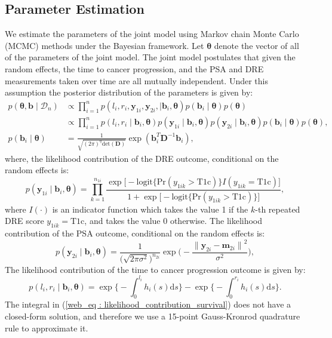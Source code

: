 \subsection{Parameter Estimation}
We estimate the parameters of the joint model using Markov chain Monte Carlo (MCMC) methods under the Bayesian framework. Let $\boldsymbol{\theta}$ denote the vector of all of the parameters of the joint model. The joint model postulates that given the random effects, the time to cancer progression, and the PSA and DRE measurements taken over time are all mutually independent. Under this assumption the posterior distribution of the parameters is given by:
\begin{align*}
p(\boldsymbol{\theta}, \boldsymbol{b} \mid \mathcal{D}_n) & \propto \prod_{i=1}^n p(l_i, r_i, \boldsymbol{y}_{1i}, \boldsymbol{y}_{2i}, \mid \boldsymbol{b}_i, \boldsymbol{\theta}) p(\boldsymbol{b}_i \mid \boldsymbol{\theta}) p(\boldsymbol{\theta})\\
& \propto \prod_{i=1}^n p(l_i, r_i \mid \boldsymbol{b}_i, \boldsymbol{\theta}) p(\boldsymbol{y}_{1i} \mid \boldsymbol{b}_i, \boldsymbol{\theta}) p(\boldsymbol{y}_{2i} \mid \boldsymbol{b}_i, \boldsymbol{\theta}) p(\boldsymbol{b}_i \mid \boldsymbol{\theta}) p(\boldsymbol{\theta}),\\
p(\boldsymbol{b}_i \mid \boldsymbol{\theta}) &= \frac{1}{\sqrt{(2 \pi)^q \text{det}(\boldsymbol{D})}} \exp(\boldsymbol{b}_i^T \boldsymbol{D}^{-1} \boldsymbol{b}_i),
\end{align*}
where, the likelihood contribution of the DRE outcome, conditional on the random effects is:
\begin{equation*}
p(\boldsymbol{y}_{1i} \mid \boldsymbol{b}_i, \boldsymbol{\theta}) = \prod_{k=1}^{n_{1i}} \frac{\exp\Big[-\mbox{logit} \big\{\mbox{Pr}(y_{1ik} > \mbox{T1c})\big\} I(y_{1ik}=\mbox{T1c}) \Big]}  {1+\exp\Big[-\mbox{logit} \big\{\mbox{Pr}(y_{1ik} > \mbox{T1c})\big\}\Big]},
\end{equation*}
where $I(\cdot)$ is an indicator function which takes the value 1 if the $k$-th repeated DRE score ${y_{1ik}=\mbox{T1c}}$, and takes the value 0 otherwise. The likelihood contribution of the PSA outcome, conditional on the random effects is:
\begin{equation*}
p(\boldsymbol{y}_{2i} \mid \boldsymbol{b}_i, \boldsymbol{\theta}) = \frac{1}{\big(\sqrt{2 \pi \sigma^2}\big)^{n_{2i}}} \exp\bigg(-\frac{{\lVert{\boldsymbol{y}_{2i} - \boldsymbol{m}_{2i}}\rVert}^2}{\sigma^2}\bigg),
\end{equation*}
The likelihood contribution of the time to cancer progression outcome is given by:
\begin{equation}
\label{web_eq : likelihood_contribution_survival}
p(l_i,r_i\mid \boldsymbol{b}_i,\boldsymbol{\theta}) = \exp\Big\{-\int_0^{l_i} h_i(s)\mathrm{d}{s}\Big\} - \exp\Big\{-\int_0^{r_i}h_i(s)\mathrm{d}{s}\Big\}.
\end{equation}
The integral in (\ref{web_eq : likelihood_contribution_survival}) does not have a closed-form solution, and therefore we use a 15-point Gauss-Kronrod quadrature rule to approximate it.

